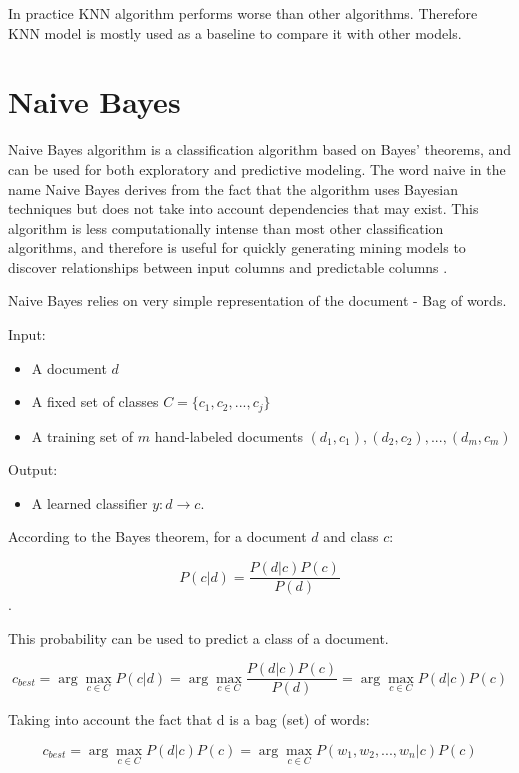 \documentclass[12pt]{report}
\begin{document}
In practice KNN algorithm performs worse than other algorithms. Therefore KNN model is mostly used as a baseline to compare it with other models.

\newpage

\section{Naive Bayes}

Naive Bayes algorithm is a classification algorithm based on Bayes' theorems, and can be used for both exploratory and predictive modeling. The word naive in the name Naive Bayes derives from the fact that the algorithm uses Bayesian techniques but does not take into account dependencies that may exist. This algorithm is less computationally intense than most other classification algorithms, and therefore is useful for quickly generating mining models to discover relationships between input columns and predictable columns \cite{mic}.

Naive Bayes relies on very simple representation of the document - Bag of words.

Input:

\begin{itemize}
  \item A document $d$
  \item A fixed set of classes $C=\{c_1, c_2,..., c_j\}$
  \item A training set of $m$ hand-labeled documents $(d_1, c_1), (d_2, c_2),..., (d_m, c_m)$
\end{itemize}

Output: 
\begin{itemize}
  \item A learned classifier $y: d \rightarrow c$.
\end{itemize}

According to the Bayes theorem, for a document $d$ and class $c$:

$$P(c | d) = \dfrac{P(d | c) P(c)}{P(d)}$$.

This probability can be used to predict a class of a document.

$$c_{best} = \arg\!\max_{c \in C} P(c | d) = \arg\!\max_{c \in C} \dfrac{P(d | c) P(c)}{P(d)} = \arg\!\max_{c \in C} {P(d | c) P(c)}$$

Taking into account the fact that d is a bag (set) of words:

$$c_{best} = \arg\!\max_{c \in C} {P(d | c) P(c)} = \arg\!\max_{c \in C} {P(w_1, w_2,..., w_n | c) P(c)}$$
\end{document}
